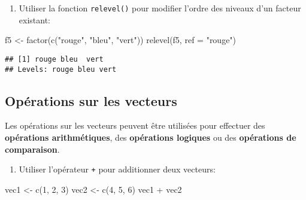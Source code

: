 \documentclass[
]{article}
\newenvironment{Shaded}{\begin{snugshade}}{\end{snugshade}}
\newcommand{\AttributeTok}[1]{\textcolor[rgb]{0.77,0.63,0.00}{#1}}
\newcommand{\DecValTok}[1]{\textcolor[rgb]{0.00,0.00,0.81}{#1}}
\newcommand{\FunctionTok}[1]{\textcolor[rgb]{0.00,0.00,0.00}{#1}}
\newcommand{\NormalTok}[1]{#1}
\newcommand{\OtherTok}[1]{\textcolor[rgb]{0.56,0.35,0.01}{#1}}
\newcommand{\SpecialCharTok}[1]{\textcolor[rgb]{0.00,0.00,0.00}{#1}}
\newcommand{\StringTok}[1]{\textcolor[rgb]{0.31,0.60,0.02}{#1}}
\providecommand{\tightlist}{%
  \setlength{\itemsep}{0pt}\setlength{\parskip}{0pt}}
\begin{document}
\begin{enumerate}
\def\labelenumi{\arabic{enumi}.}
\setcounter{enumi}{4}
\tightlist
\item
  Utiliser la fonction \texttt{relevel()} pour modifier l'ordre des niveaux d'un facteur existant:
\end{enumerate}

\begin{Shaded}
\begin{Highlighting}[]
\NormalTok{f5 }\OtherTok{\textless{}{-}} \FunctionTok{factor}\NormalTok{(}\FunctionTok{c}\NormalTok{(}\StringTok{"rouge"}\NormalTok{, }\StringTok{"bleu"}\NormalTok{, }\StringTok{"vert"}\NormalTok{))}
\FunctionTok{relevel}\NormalTok{(f5, }\AttributeTok{ref =} \StringTok{"rouge"}\NormalTok{)}
\end{Highlighting}
\end{Shaded}

\begin{verbatim}
## [1] rouge bleu  vert 
## Levels: rouge bleu vert
\end{verbatim}

\hypertarget{opuxe9rations-sur-les-vecteurs}{%
\subsection{Opérations sur les vecteurs}\label{opuxe9rations-sur-les-vecteurs}}

Les opérations sur les vecteurs peuvent être utilisées pour effectuer des \textbf{opérations arithmétiques}, des \textbf{opérations logiques} ou des \textbf{opérations de comparaison}.

\begin{enumerate}
\def\labelenumi{\arabic{enumi}.}
\tightlist
\item
  Utiliser l'opérateur \texttt{+} pour additionner deux vecteurs:
\end{enumerate}

\begin{Shaded}
\begin{Highlighting}[]
\NormalTok{vec1 }\OtherTok{\textless{}{-}} \FunctionTok{c}\NormalTok{(}\DecValTok{1}\NormalTok{, }\DecValTok{2}\NormalTok{, }\DecValTok{3}\NormalTok{)}
\NormalTok{vec2 }\OtherTok{\textless{}{-}} \FunctionTok{c}\NormalTok{(}\DecValTok{4}\NormalTok{, }\DecValTok{5}\NormalTok{, }\DecValTok{6}\NormalTok{)}
\NormalTok{vec1 }\SpecialCharTok{+}\NormalTok{ vec2}
\end{Highlighting}
\end{Shaded}
\end{document}
